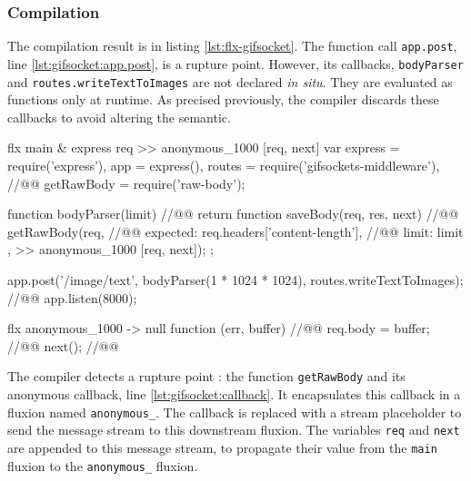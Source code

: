 \subsubsection{Compilation} \label{chapter5:flx:evaluation:compilation}

The compilation result is in listing \ref{lst:flx-gifsocket}.
The function call \texttt{app.post}, line \ref{lst:gifsocket:app.post}, is a rupture point.
However, its callbacks, \texttt{bodyParser} and \texttt{routes.write\-Text\-To\-Images} are not declared \textit{in situ}.
They are evaluated as functions only at runtime.
As precised previously, the compiler discards these callbacks to avoid altering the semantic. %

\begin{code}[flx, caption={Compilation result of gifsockets-server},label={lst:flx-gifsocket}]
flx main & express {req}
>> anonymous_1000 [req, next]
  var express = require('express'),
      app = express(),
      routes = require('gifsockets-middleware'), //@\label{lst:flx-gifsocket:gif-mw}@
      getRawBody = require('raw-body');

  function bodyParser(limit) { //@\label{lst:flx-gifsocket:bodyParser}@
    return function saveBody(req, res, next) { //@\label{lst:flx-gifsocket:saveBody}@
      getRawBody(req, { //@\label{lst:flx-gifsocket:getRawBody}@
        expected: req.headers['content-length'], //@\label{lst:flx-gifsocket:req.headers}@
        limit: limit
      }, >> anonymous_1000 [req, next]);
    };
  }

  app.post('/image/text', bodyParser(1 * 1024 * 1024), routes.writeTextToImages); //@\label{lst:flx-gifsocket:app.post}@
  app.listen(8000);

flx anonymous_1000
-> null
  function (err, buffer) { //@\label{lst:flx-gifsocket:callback}@
    req.body = buffer; //@\label{lst:flx-gifsocket:buffer}@
    next(); //@\label{lst:flx-gifsocket:next}@
  }
\end{code}

The compiler detects a rupture point : the function \texttt{get\-Raw\-Body} and its anonymous callback, line \ref{lst:gifsocket:callback}.
It encapsulates this callback in a fluxion named \texttt{anony\-mous\_}.
The callback is replaced with a stream placeholder to send the message stream to this downstream fluxion.
The variables \texttt{req} and \texttt{next} are appended to this message stream, to propagate their value from the \texttt{main} fluxion to the \texttt{anony\-mous\_} fluxion.

